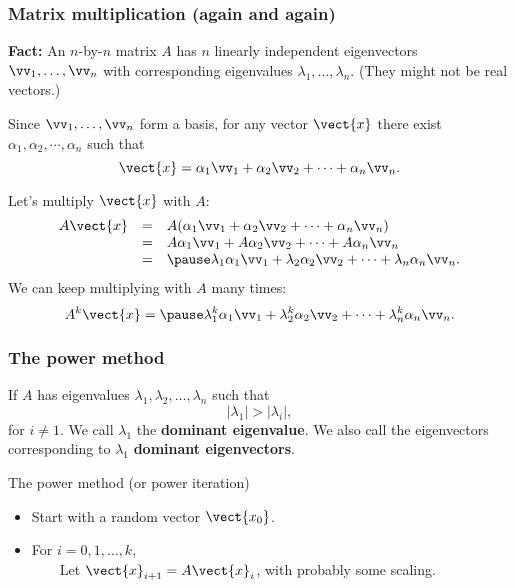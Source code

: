 \begin{frame}
  \frametitle{Matrix multiplication (again and again)}

  {\bf Fact:} An $n$-by-$n$ matrix $A$ has $n$ linearly independent
  eigenvectors $\vv_1,\ldots,\vv_n$ with corresponding eigenvalues
  $\lambda_1,\ldots,\lambda_n$.  (They might not be real vectors.)

  \pause Since $\vv_1,\ldots,\vv_n$ form a basis, for any vector
  $\vect{x}$ there exist $\alpha_1,\alpha_2,\cdots,\alpha_n$ such that
  \[
  \vect{x} = \alpha_1\vv_1 + \alpha_2\vv_2 + \cdots + \alpha_n\vv_n.
  \]

  \pause
  Let's multiply $\vect{x}$ with $A$:
  \[
  \begin{array}{rcl}
    A\vect{x} &=& A(\alpha_1\vv_1 + \alpha_2\vv_2 + \cdots + \alpha_n\vv_n) \\
    &=& A\alpha_1\vv_1 + A\alpha_2\vv_2 + \cdots + A\alpha_n\vv_n \\
    &=& \pause
    \lambda_1\alpha_1\vv_1 + \lambda_2\alpha_2\vv_2 + \cdots + \lambda_n\alpha_n\vv_n.
  \end{array}
  \]
  \pause We can keep multiplying with $A$ many times:
  \[
  A^k\vect{x}=
  \pause
  \lambda_1^k\alpha_1\vv_1 + \lambda_2^k\alpha_2\vv_2 + \cdots + \lambda_n^k\alpha_n\vv_n.
  \]
\end{frame}

\begin{frame}
  \frametitle{The power method}
  If $A$ has eigenvalues $\lambda_1,\lambda_2,\ldots,\lambda_n$ such that
  \[
  |\lambda_1| > |\lambda_i|,
  \]
  for $i\neq 1$.  We call $\lambda_1$ the {\bf dominant eigenvalue}.
  We also call the eigenvectors corresponding to $\lambda_1$ {\bf
    dominant eigenvectors}.

  \vspace{0.2in}
  \begin{block}{The power method (or power iteration)}
    \begin{itemize}
    \item Start with a random vector $\vect{x_0}$.
    \item For $i=0,1,\ldots,k$, \\
      \ \ \ \ Let $\vect{x}_{i+1}=A\vect{x}_i$, with
      probably some scaling.
    \end{itemize}
  \end{block}
\end{frame}
